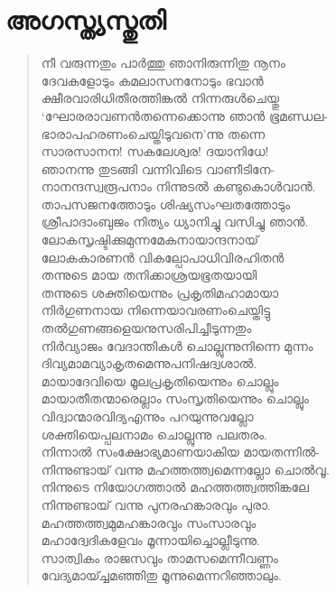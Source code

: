 \section{അഗസ്ത്യസ്തുതി}

\begin{verse}
നീ വരുന്നതും പാര്‍ത്തു ഞാനിരുന്നിതു നൂനം\\
ദേവകളോടും കമലാസനനോടും ഭവാന്‍\\
ക്ഷീരവാരിധിതീരത്തിങ്കല്‍ നിന്നരുള്‍ചെയ്തു\\
‘ഘോരരാവണന്‍തന്നെക്കൊന്നു ഞാന്‍ ഭൂമണ്ഡല-\\
ഭാരാപഹരണംചെയ്തിടുവനെ’ന്നു തന്നെ\\
സാരസാനന! സകലേശ്വര! ദയാനിധേ!\\
ഞാനന്നു തുടങ്ങി വന്നിവിടെ വാണീടിനേ-\\
നാനന്ദസ്വരൂപനാം നിന്നുടല്‍ കണ്ടുകൊള്‍വാന്‍.\\
താപസജനത്തോടും ശിഷ്യസംഘതത്തോടും\\
ശ്രീപാദാംബുജം നിത്യം ധ്യാനിച്ചു വസിച്ചു ഞാന്‍.\\
ലോകസൃഷ്ടിക്കുമുന്നമേകനായാന്ദനായ്\\
ലോകകാരണന്‍ വികല്പോപാധിവിരഹിതന്‍\\
തന്നുടെ മായ തനിക്കാശ്രയഭൂതയായി\\
തന്നുടെ ശക്തിയെന്നും പ്രകൃതിമഹാമായാ\\
നിര്‍ഗുണനായ നിന്നെയാവരണംചെയ്തിട്ടു\\
തല്‍ഗുണങ്ങളെയനുസരിപിച്ചീടുന്നതും\\
നിര്‍വ്യാജം വേദാന്തികള്‍ ചൊല്ലുന്നുനിന്നെ മുന്നം\\
ദിവ്യമാമവ്യാകൃതമെന്നുപനിഷദ്വശാല്‍.\\
മായാദേവിയെ മൂലപ്രകൃതിയെന്നും ചൊല്ലും\\
മായാതീതന്മാരെല്ലാം സംസൃതിയെന്നും ചൊല്ലും\\
വിദ്വാന്മാരവിദ്യഎന്നും പറയുന്നുവല്ലോ\\
ശക്തിയെപ്പലനാമം ചൊല്ലുന്നു പലതരം.\\
നിന്നാല്‍ സംക്ഷോഭ്യമാണയാകിയ മായതന്നില്‍-\\
നിന്നുണ്ടായ് വന്നു മഹത്തത്ത്വമെന്നല്ലോ ചൊല്‍വൂ.\\
നിന്നുടെ നിയോഗത്താല്‍ മഹത്തത്ത്വത്തിങ്കലേ\\
നിന്നുണ്ടായ് വന്നു പുനരഹങ്കാരവും പുരാ.\\
മഹത്തത്ത്വമുമഹങ്കാരവും സംസാരവും\\
മഹാദ്വേദികളേവം മൂന്നായിച്ചൊല്ലീടുന്നു.\\
സാത്വികം രാജസവും താമസമെന്നീവണ്ണം\\
വേദ്യമായ്ച്ചമഞ്ഞിതു മൂന്നുമെന്നറിഞ്ഞാലും.\\

\end{verse}
